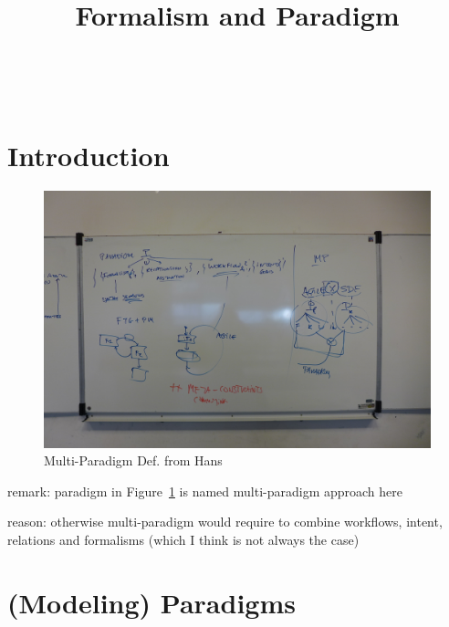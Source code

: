 \documentclass[a4paper,8pt]{article}
\begin{document}
	
	\title{Formalism and Paradigm}
	\maketitle

\tableofcontents

~\newpage
\section{Introduction}	


\begin{figure}[h]
\centering
\begin{center}
 \includegraphics[scale=0.50]{P1130927.jpg}
\caption{Multi-Paradigm Def. from Hans}
\label{fig:paradigm-hans}
\end{center}
\end{figure}
%  

remark: paradigm in Figure~\ref{fig:paradigm-hans} is named multi-paradigm approach here

reason: otherwise multi-paradigm would require to combine workflows, intent, relations and formalisms (which I think is not always the case)




\section{(Modeling) Paradigms}	
\end{document}
